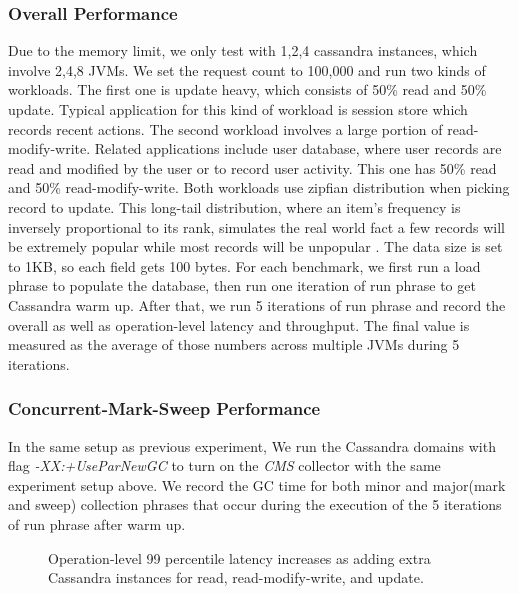 \documentclass{sig-alternate}
\begin{document}
\subsubsection{Overall Performance}
Due to the memory limit, we only test with 1,2,4 cassandra instances, which involve 2,4,8 JVMs. We set the request count to 100,000 and run two kinds of workloads. The first one is update heavy, which consists of 50\% read and 50\% update. Typical application for this kind of workload is session store which records recent actions. The second workload involves a large portion of read-modify-write. Related applications include user database, where user records are read and modified by the user or to record user activity. This one has 50\% read and 50\% read-modify-write. Both workloads use zipfian distribution when picking record to update. This long-tail distribution, where an item's frequency is inversely proportional to its rank, simulates the real world fact a few records will be extremely popular while most records will be unpopular \cite{adamic2002zipf}. The data size is set to 1KB, so each field gets 100 bytes. For each benchmark, we first run a load phrase to populate the database, then run one iteration of run phrase to get Cassandra warm up. After that, we run 5 iterations of run phrase and record the overall as well as operation-level latency and throughput. The final value is measured as the average of those numbers across multiple JVMs during 5 iterations.

\subsubsection{Concurrent-Mark-Sweep Performance}
In the same setup as previous experiment, We run the Cassandra domains with flag \textit{-XX:+UseParNewGC} to turn on the \textit{CMS} collector with the same experiment setup above. We record the GC time for both minor and major(mark and sweep) collection phrases that occur during the execution of the 5 iterations of run phrase after warm up.

\begin{figure*}

\centering
{}
\caption{Operation-level 99 percentile latency increases as adding extra Cassandra instances for read, read-modify-write, and update.}
\label{fig:cassandraresults}
\end{figure*}
\end{document}
